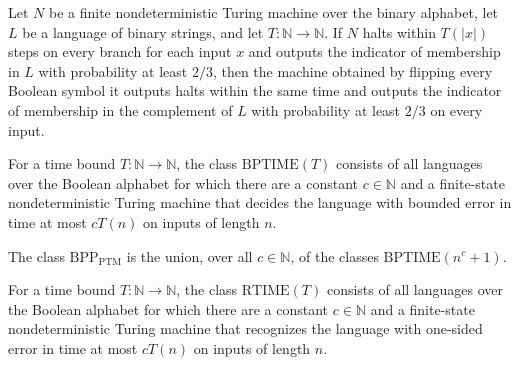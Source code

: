 \begin{theorem}
\label{Turing.FinNDTM.BPDecidesInTime.flipOutput}
\leanok
{}
Let $N$ be a finite nondeterministic Turing machine over the binary alphabet, let $L$ be
a language of binary strings, and let $T\colon\mathbb{N}\to\mathbb{N}$. If $N$ halts
within $T(|x|)$ steps on every branch for each input $x$ and outputs the indicator of
membership in $L$ with probability at least $2/3$, then the machine obtained by flipping
every Boolean symbol it outputs halts within the same time and outputs the indicator of
membership in the complement of $L$ with probability at least $2/3$ on every input.
\end{theorem}

\begin{definition}
\label{Randomized.BPTIME}
\leanok
{}
For a time bound $T\colon\mathbb{N}\to\mathbb{N}$, the class $\mathrm{BPTIME}(T)$
consists of all languages over the Boolean alphabet for which there are a constant
$c\in\mathbb{N}$ and a finite-state nondeterministic Turing machine that decides the
language with bounded error in time at most $cT(n)$ on inputs of length $n$.
\end{definition}

\begin{definition}
\label{Randomized.BPP_PTM}
\leanok
{}
The class $\mathrm{BPP}_{\mathrm{PTM}}$ is the union, over all $c\in\mathbb{N}$, of the
classes $\mathrm{BPTIME}(n^c+1)$.
\end{definition}

\begin{definition}
\label{Randomized.RTIME}
\leanok
{}
For a time bound $T\colon\mathbb{N}\to\mathbb{N}$, the class $\mathrm{RTIME}(T)$
consists of all languages over the Boolean alphabet for which there are a constant
$c\in\mathbb{N}$ and a finite-state nondeterministic Turing machine that recognizes the
language with one-sided error in time at most $cT(n)$ on inputs of length $n$.
\end{definition}

